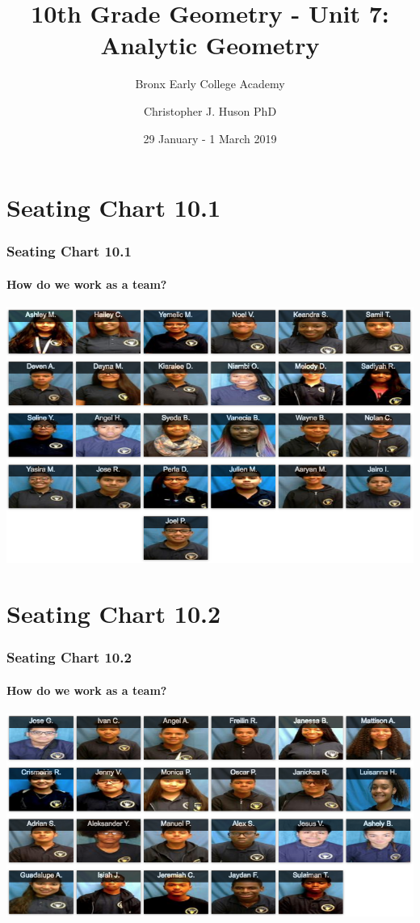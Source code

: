 \documentclass{beamer}
\title{10th Grade Geometry - Unit 7: Analytic Geometry}
\subtitle{Bronx Early College Academy}
\author{Christopher J. Huson PhD}
\date{29 January - 1 March 2019}
\begin{document}
\frame{\titlepage}
\section[Outline]{}
\frame{\tableofcontents}


\section{Seating Chart 10.1}
  \frame
  {
    \frametitle{Seating Chart 10.1}
    \framesubtitle{How do we work as a team?}

    \includegraphics[width=1.0\textwidth]{seating-10A.png}
  }

\section{Seating Chart 10.2}
  \frame
  {
    \frametitle{Seating Chart 10.2}
    \framesubtitle{How do we work as a team?}

    \includegraphics[width=1.0\textwidth]{seating-10B.png}
  }
\end{document}
